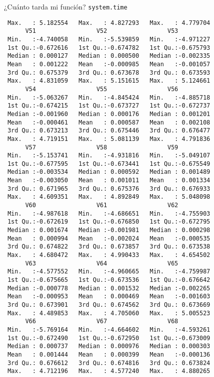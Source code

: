 \documentclass[xcolor={usenames,svgnames,dvipsnames}]{beamer}
\begin{document}
\begin{frame}[label={sec:orga833b1a},fragile]{¿Cuánto tarda mi función? \texttt{system.time}}
\begin{verbatim}
 Max.   : 5.182554   Max.   : 4.827293   Max.   : 4.779704  
      V51                 V52                 V53           
 Min.   :-4.740058   Min.   :-5.539859   Min.   :-4.971227  
 1st Qu.:-0.672616   1st Qu.:-0.674782   1st Qu.:-0.675793  
 Median : 0.000127   Median : 0.000500   Median :-0.002335  
 Mean   : 0.001222   Mean   :-0.000985   Mean   :-0.001057  
 3rd Qu.: 0.675379   3rd Qu.: 0.673678   3rd Qu.: 0.673593  
 Max.   : 4.831059   Max.   : 5.151615   Max.   : 5.124661  
      V54                 V55                 V56           
 Min.   :-5.063267   Min.   :-4.845424   Min.   :-4.885718  
 1st Qu.:-0.674215   1st Qu.:-0.673727   1st Qu.:-0.672737  
 Median :-0.001960   Median : 0.000176   Median : 0.001201  
 Mean   :-0.000461   Mean   : 0.000587   Mean   : 0.002108  
 3rd Qu.: 0.673213   3rd Qu.: 0.675446   3rd Qu.: 0.676477  
 Max.   : 4.719151   Max.   : 5.081139   Max.   : 4.791836  
      V57                 V58                 V59           
 Min.   :-5.153741   Min.   :-4.931816   Min.   :-5.049107  
 1st Qu.:-0.677595   1st Qu.:-0.673441   1st Qu.:-0.675549  
 Median :-0.003534   Median : 0.000592   Median : 0.001489  
 Mean   :-0.003050   Mean   : 0.001011   Mean   : 0.001334  
 3rd Qu.: 0.671965   3rd Qu.: 0.675376   3rd Qu.: 0.676933  
 Max.   : 4.609351   Max.   : 4.892849   Max.   : 5.048098  
      V60                 V61                 V62           
 Min.   :-4.987618   Min.   :-4.686651   Min.   :-4.755903  
 1st Qu.:-0.672619   1st Qu.:-0.676850   1st Qu.:-0.672795  
 Median : 0.001674   Median :-0.001981   Median : 0.000298  
 Mean   : 0.000994   Mean   :-0.002024   Mean   :-0.000535  
 3rd Qu.: 0.674822   3rd Qu.: 0.673857   3rd Qu.: 0.673538  
 Max.   : 4.680472   Max.   : 4.990433   Max.   : 4.654502  
      V63                 V64                 V65           
 Min.   :-4.577552   Min.   :-4.960665   Min.   :-4.759987  
 1st Qu.:-0.675665   1st Qu.:-0.673536   1st Qu.:-0.676642  
 Median :-0.000778   Median : 0.001532   Median :-0.002265  
 Mean   :-0.000953   Mean   : 0.000469   Mean   :-0.001603  
 3rd Qu.: 0.673901   3rd Qu.: 0.674562   3rd Qu.: 0.673669  
 Max.   : 4.489853   Max.   : 4.705060   Max.   : 5.005523  
      V66                 V67                 V68           
 Min.   :-5.769164   Min.   :-4.664602   Min.   :-4.593261  
 1st Qu.:-0.672490   1st Qu.:-0.672950   1st Qu.:-0.673009  
 Median : 0.000737   Median : 0.000976   Median : 0.000303  
 Mean   : 0.001444   Mean   : 0.000399   Mean   :-0.000136  
 3rd Qu.: 0.676612   3rd Qu.: 0.674816   3rd Qu.: 0.673824  
 Max.   : 4.712196   Max.   : 4.577240   Max.   : 4.880265  

\end{verbatim}
\end{frame}
\end{document}

